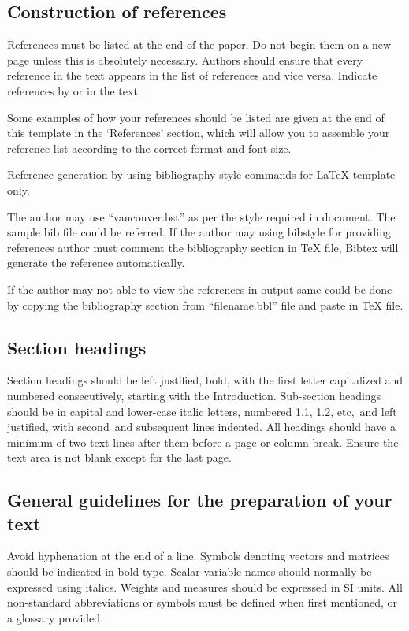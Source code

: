\documentclass[3p,times,procedia,twocolumn,twoside]{elsarticle}
\begin{document}

\subsection{ Construction of references}
References must be listed at the end of the paper. Do not begin them
on a new page unless this is absolutely necessary. Authors should
ensure that every reference in the text appears in the list of
references and vice versa. Indicate references by \cite[page 3]{Vander} or
\cite{Strunk,Mettam} in the text.


Some examples of how your references should be listed are given at the
end of this template in the `References' section, which will allow you
to assemble your reference list according to the correct format and
font size.

Reference generation by using bibliography style commands for LaTeX
template only.

The author may use ``vancouver.bst'' as per the style required
in document. The sample bib file could be referred.  If the author may
using bibstyle for providing references author must comment the
bibliography section in TeX file, Bibtex will generate the reference
automatically.

If the author may not able to view the references in output same could
be done by copying the bibliography section from ``filename.bbl'' file
and paste in TeX file.



\subsection{Section headings}
Section headings should be left justified, bold, with the first letter
capitalized and numbered consecutively, starting with the
Introduction. Sub-section headings should be in capital and lower-case
italic letters, numbered 1.1, 1.2, etc,~and left justified, with
second~and subsequent lines indented. All headings should have a
minimum of two text lines after them before a page or column break.
Ensure the text area is not blank except for the last page.


\subsection{General guidelines for the preparation of your text}
Avoid hyphenation at the end of a line. Symbols denoting vectors and
matrices should be indicated in bold type. Scalar variable names
should normally be expressed using italics. Weights and measures
should be expressed in SI units. All non-standard abbreviations or
symbols must be defined when first mentioned, or a glossary provided.
\end{document}
